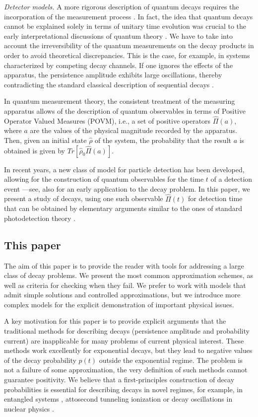 \documentclass[12pt]{article}
\numberwithin{equation}{section}
\begin{document}
 \medskip

 {\em Detector models.} A more rigorous description of quantum decays requires the incorporation of  the measurement process  \cite{EkSi, GhiFo}. In fact, the idea that quantum decays cannot be explained solely in terms of unitary time evolution was  crucial to the early interpretational discussions of quantum theory \cite{Heismem}. We have to take into account   the irreversibility of the quantum measurements on the decay products  in order to avoid theoretical discrepancies. This is the case, for example, in systems characterized by competing decay channels. If one ignores the effects of the apparatus, the persistence amplitude  exhibits large oscillations, thereby contradicting the standard classical description of sequential decays \cite{FoGhi}.

In quantum measurement theory, the consistent treatment of the measuring apparatus allows of the description of quantum observables in terms of Positive Operator Valued Measures (POVM), i.e., a set of positive operators $\hat{\Pi}(a)$, where $a$ are the values of the physical magnitude recorded by the apparatus. Then, given an initial state $\hat{\rho}$ of the system, the probability that the result $a$ is obtained is given by $Tr\left[\hat{\rho}_0 \hat{\Pi}(a)\right]$.

 In recent years, a new class of model for particle detection has been developed, allowing    for  the construction of quantum observables for the time $t$ of a detection event \cite{AnSav}---see, also \cite{An08} for an early application to the decay problem. In this paper, we present a study of decays, using one such
observable $\hat{\Pi}(t)$ for detection time  that can be obtained by  elementary arguments similar to the ones of standard photodetection theory \cite{Glauber}.


\subsection{This paper}
The aim of this paper is to provide the
 reader with tools for addressing a large class of decay problems. We present the most common approximation schemes, as well as criteria for checking when they fail. We prefer to work with models that admit simple solutions and controlled approximations, but we introduce more complex models for the explicit demonstration of important physical issues.

A key motivation for this paper is to provide explicit arguments that the traditional methods for describing decays (persistence amplitude and probability current) are inapplicable for many problems of current physical interest.  These methods work excellently for exponential decays, but they lead to negative values of the decay probability $p(t)$ outside the exponential regime. The problem is not a failure of some approximation,  the  very definition of such methods cannot guarantee positivity. We believe that a first-principles construction of decay probabilities is essential for describing decays in novel regimes, for example, in entangled systems \cite{AnHu2, CVS17, C18}, attosecond tunneling ionization \cite{atto} or decay oscillations in nuclear physics \cite{GSI}.
\end{document}
